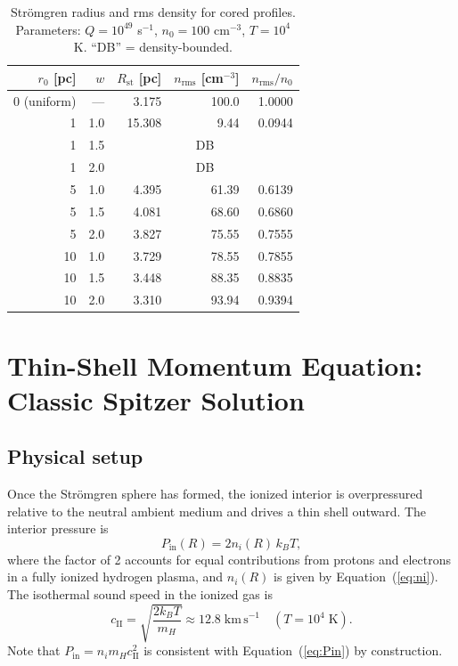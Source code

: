 \documentclass[12pt]{article}
\begin{document}
\begin{table}[ht]
\centering
\caption{Str\"omgren radius and rms density for cored profiles.
         Parameters: $Q=10^{49}$ s$^{-1}$, $n_0=100$ cm$^{-3}$,
         $T=10^4$ K. ``DB'' = density-bounded.}
\label{tab:cored}
\begin{tabular}{rrrrr}
\toprule
$r_0$ [pc] & $w$ & $R_\mathrm{st}$ [pc] & $n_\mathrm{rms}$ [cm$^{-3}$] & $n_\mathrm{rms}/n_0$ \\
\midrule
0 (uniform) & --- & 3.175 & 100.0 & 1.0000 \\
\midrule
1  & 1.0 & 15.308 &  9.44 & 0.0944 \\
1  & 1.5 & \multicolumn{3}{c}{DB} \\
1  & 2.0 & \multicolumn{3}{c}{DB} \\
\midrule
5  & 1.0 &  4.395 & 61.39 & 0.6139 \\
5  & 1.5 &  4.081 & 68.60 & 0.6860 \\
5  & 2.0 &  3.827 & 75.55 & 0.7555 \\
\midrule
10 & 1.0 &  3.729 & 78.55 & 0.7855 \\
10 & 1.5 &  3.448 & 88.35 & 0.8835 \\
10 & 2.0 &  3.310 & 93.94 & 0.9394 \\
\bottomrule
\end{tabular}
\end{table}

\section{Thin-Shell Momentum Equation: Classic Spitzer Solution}
\label{sec:spitzer}

\subsection{Physical setup}

Once the Str\"omgren sphere has formed, the ionized interior is overpressured
relative to the neutral ambient medium and drives a thin shell outward.  The
interior pressure is \citep{Spitzer1978}
\begin{equation}
  \label{eq:Pin}
  P_\mathrm{in}(R) = 2 n_i(R)\, k_B T,
\end{equation}
where the factor of 2 accounts for equal contributions from protons and
electrons in a fully ionized hydrogen plasma, and $n_i(R)$ is given by
Equation~(\ref{eq:ni}).  The isothermal sound speed in the ionized gas is
\begin{equation}
  \label{eq:cII}
  c_\mathrm{II} = \sqrt{\frac{2k_BT}{m_H}} \approx 12.8\;\mathrm{km\,s}^{-1}
  \quad (T = 10^4\;\mathrm{K}).
\end{equation}
Note that $P_\mathrm{in} = n_i m_H c_\mathrm{II}^2$ is consistent with
Equation~(\ref{eq:Pin}) by construction.
\end{document}
